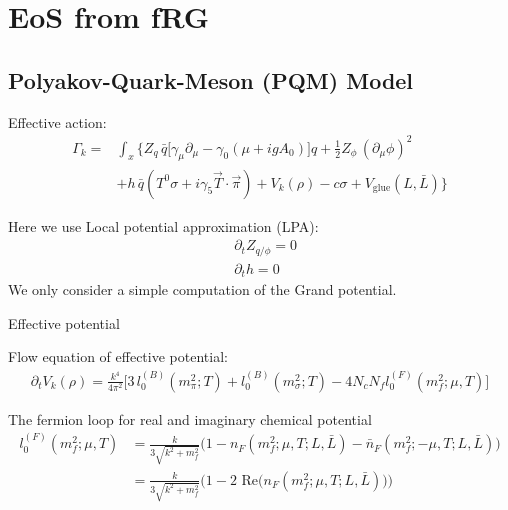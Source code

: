 \section{EoS from fRG}

\subsection{Polyakov-Quark-Meson (PQM) Model}

\begin{frame}
\begin{block}{Effective action:}
    \begin{align}
     \Gamma_k=&\int_x \Big\{ Z_q\,\bar{q}\big[\gamma_\mu\partial_\mu-\gamma_0(\mu+igA_0)\big]q+\frac{1}{2}Z_\phi\,(\partial_\mu\phi)^2 \nonumber\\
     &+h\,\bar{q}(T^0\sigma+i\gamma_5\vec{T}\cdot\vec{\pi})+V_k(\rho)-c\sigma+V_{\mathrm{glue}}(L,\bar{L}) \Big\}
    \end{align}
\end{block}

Here we use Local potential approximation (LPA):
\begin{align}
&\partial_tZ_{q/\phi}=0\\[2ex]
&\partial_th=0
\end{align}
We only consider a simple computation of the Grand potential.
\end{frame}
\begin{frame}[fragile]{Effective potential}
\begin{block}{Flow equation of effective potential:}
    \begin{align}
     \partial_t V_k(\rho)=\frac{k^4}{4\pi^2}\Bigg[3\,l^{(B)}_0(m^2_\pi; T)+l^{(B)}_0(m^2_\sigma; T)-4N_cN_fl^{(F)}_0(m^2_f;\mu, T)\Bigg]
    \end{align}
\end{block}
The fermion loop for real and imaginary chemical potential
\begin{align}
    l^{(F)}_0(m^2_f;\mu, T)&=\frac{k}{3\sqrt{k^2+m^2_f}}\bigg(1-n_F(m^2_f;\mu, T;L,\bar{L})-\bar{n}_F(m^2_f;-\mu, T;L,\bar{L})\bigg)\\
    &=\frac{k}{3\sqrt{k^2+m^2_f}}\bigg(1-2\,\,\mathrm{Re}\Big(n_F(m^2_f;\mu, T;L,\bar{L})\Big)\bigg)
\end{align}
\end{frame}

